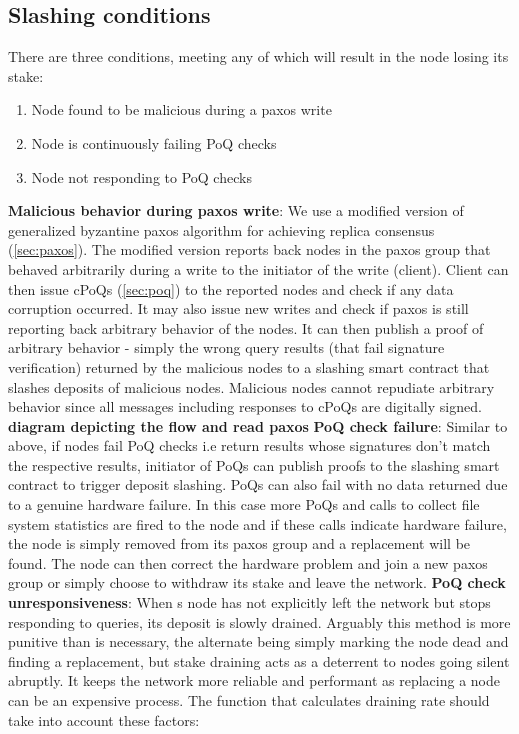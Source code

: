  \subsection{Slashing conditions} \label{sec:slashing}
 There are three conditions, meeting any of which will result in the node losing its stake:
 \begin{enumerate}
 	\item Node found to be malicious during a paxos write
 	\item Node is continuously failing PoQ checks
 	\item Node not responding to PoQ checks
 \end{enumerate}
\textbf{Malicious behavior during paxos write}: We use a modified version of generalized byzantine paxos algorithm \cite{byzantine_paxos} for achieving replica consensus (\cref{sec:paxos}). The modified version reports back nodes in the paxos group that behaved arbitrarily during a write to the initiator of the write (client). Client can then issue cPoQs (\cref{sec:poq}) to the reported nodes and check if any data corruption occurred. It may also issue new writes and check if paxos is still reporting back arbitrary behavior of the nodes. It can then publish a proof of arbitrary behavior - simply the wrong query results (that fail signature verification) returned by the malicious nodes to a slashing smart contract that slashes deposits of malicious nodes. Malicious nodes cannot repudiate arbitrary behavior since all messages including responses to cPoQs are digitally signed.
\newline\newline
\textbf{\Large{diagram depicting the flow and read paxos}}
\newline\newline
\textbf{PoQ check failure}: Similar to above, if nodes fail PoQ checks i.e return results whose signatures don't match the respective results, initiator of PoQs can publish proofs to the slashing smart contract to trigger deposit slashing. PoQs can also fail with no data returned due to a genuine hardware failure. In this case more PoQs and calls to collect file system statistics are fired to the node and if these calls indicate hardware failure, the node is simply removed from its paxos group and a replacement will be found. The node can then correct the hardware problem and join a new paxos group or simply choose to withdraw its stake and leave the network.
\newline\newline
\textbf{PoQ check unresponsiveness}: When s node has not explicitly left the network but stops responding to queries, its deposit is slowly drained. Arguably this method is more punitive than is necessary, the alternate being simply marking the node dead and finding a replacement, but stake draining acts as a deterrent to nodes going silent abruptly. It keeps the network more reliable and performant as replacing a node can be an expensive process. The function that calculates draining rate should take into account these factors:
